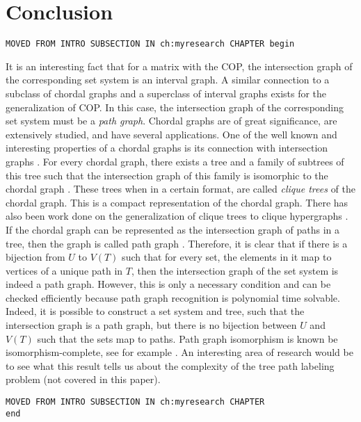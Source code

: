 \chapter{Conclusion}
\label{ch:conclusion}

\begin{center} {\tt MOVED FROM INTRO SUBSECTION IN ch:myresearch
    CHAPTER begin}
\end{center}

It is an interesting fact that for a matrix with the COP, the
intersection graph of the corresponding set system is an interval
graph. %
A similar connection to a subclass of chordal graphs and a superclass
of interval graphs exists for the generalization of COP.  In this
case, the intersection graph of the corresponding set system must be a
{\em path graph}. Chordal graphs are of great significance, are
extensively studied, and have several applications.  One of the well
known and interesting properties of a chordal graphs is its connection
with intersection graphs \cite{mcg04}. For every chordal graph, there
exists a tree and a family of subtrees of this tree such that the
intersection graph of this family is isomorphic to the chordal graph
\cite{plr70,gav78,bp93}.  These trees when in a certain format, are
called {\em clique trees} \cite{apy92} of the chordal graph. This is a
compact representation of the chordal graph. There has also been work
done on the generalization of clique trees to clique hypergraphs
\cite{km02}.  If the chordal graph can be represented as the
intersection graph of paths in a tree, then the graph is called path
graph \cite{mcg04}.  Therefore, it is clear that if there is a
bijection from $U$ to $V(T)$ such that for every set, the elements in
it map to vertices of a unique path in $T$, then the intersection
graph of the set system is indeed a path graph.  However, this is only
a necessary condition and can be checked efficiently because path
graph recognition is polynomial time
solvable\cite{gav78,aas93}. Indeed, it is possible to construct a set
system and tree, such that the intersection graph is a path graph, but
there is no bijection between $U$ and $V(T)$ such that the sets map to
paths. Path graph isomorphism is known be isomorphism-complete, see
for example \cite{kklv10}. An interesting area of research would be to
see what this result tells us about the complexity of the tree path
labeling problem (not covered in this paper).

\begin{center} {\tt MOVED FROM INTRO SUBSECTION IN ch:myresearch
    CHAPTER\\ end}
\end{center}

